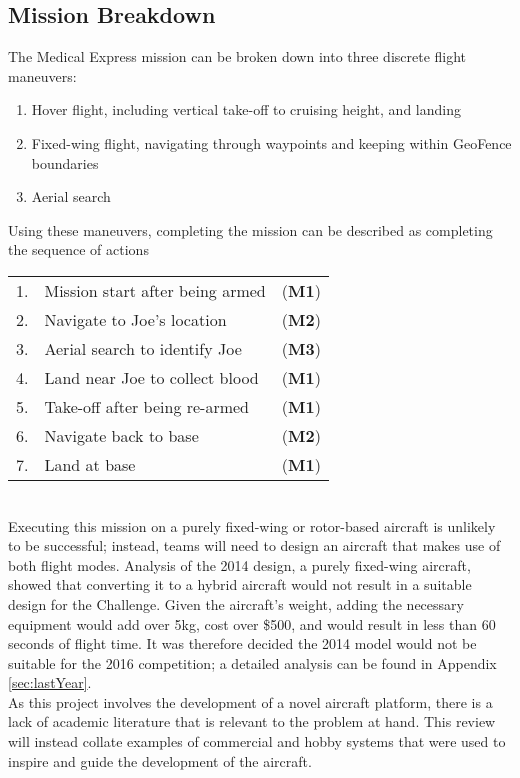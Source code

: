 \subsection{Mission Breakdown}
\label{sec:flightmaneuvers}
The Medical Express mission can be broken down into three discrete flight maneuvers:
\begin{enumerate}[label=\bfseries M\arabic*:] \itemsep-2pt
	\item Hover flight, including vertical take-off to cruising height, and landing
	\item Fixed-wing flight, navigating through waypoints and keeping within GeoFence boundaries
	\item Aerial search
\end{enumerate}

Using these maneuvers, completing the mission can be described as completing the sequence of actions\\
\begin{tabular}{r l l}
	1. & Mission start after being armed & (\textbf{M1}) \\ 
	2. & Navigate to Joe's location & (\textbf{M2}) \\ 
	3. & Aerial search to identify Joe & (\textbf{M3}) \\ 
	4. & Land near Joe to collect blood & (\textbf{M1}) \\ 
	5. & Take-off after being re-armed & (\textbf{M1}) \\ 
	6. & Navigate back to base & (\textbf{M2}) \\ 
	7. & Land at base & (\textbf{M1}) \\ 
\end{tabular}\\

Executing this mission on a purely fixed-wing or rotor-based aircraft is unlikely to be successful; instead, teams will need to design an aircraft that makes use of both flight modes. Analysis of the 2014 design, a purely fixed-wing aircraft, showed that converting it to a hybrid aircraft would not result in a suitable design for the Challenge. Given the aircraft's weight, adding the necessary equipment would add over 5kg, cost over \$500, and would result in less than 60 seconds of flight time. It was therefore decided the 2014 model would not be suitable for the 2016 competition; a detailed analysis can be found in Appendix \ref{sec:lastYear}.\\

As this project involves the development of a novel aircraft platform, there is a lack of academic literature that is relevant to the problem at hand. This review will instead collate examples of commercial and hobby systems that were used to inspire and guide the development of the aircraft.\\

